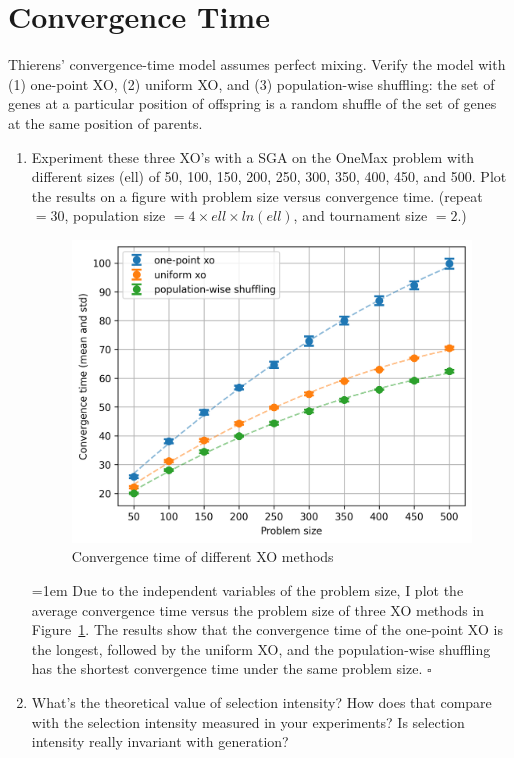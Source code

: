 \documentclass{article}
\begin{document}
\section{Convergence Time}
Thierens’ convergence-time model assumes perfect mixing. Verify the model
with (1) one-point XO, (2) uniform XO, and (3) population-wise shuffling: the set of genes at a particular position of offspring is a random shuffle
of the set of genes at the same position of parents.
\begin{enumerate}[label=(\alph*)]
      \item 
      Experiment these three XO’s with a SGA on the OneMax problem with
      different sizes (ell) of 50, 100, 150, 200, 250, 300, 350, 400, 450, and 500. Plot
      the results on a figure with problem size versus convergence time. (repeat $=30$, population
      size $= 4\times ell \times ln(ell)$, and tournament size $=2$.)

      \begin{figure}[ht]
            \centering
            \includegraphics[width=0.7\linewidth]{fig-tconv_ell.png}
            \caption{\label{fig:convergence_time}Convergence time of different XO methods}
      \end{figure}
      \parindent=1em
      Due to the independent variables of the problem size, I plot the average convergence time versus
      the problem size of three XO methods in Figure~\ref{fig:convergence_time}. 
      The results show that the convergence time of the one-point XO is the longest, followed by the uniform XO,
      and the population-wise shuffling has the shortest convergence time under the same problem size.
      \hfill $\square$
      \vspace{0.5em}
      
      \item
      What’s the theoretical value of selection intensity? How does that compare
      with the selection intensity measured in your experiments? Is selection
      intensity really invariant with generation?


\end{enumerate}
\end{document}
